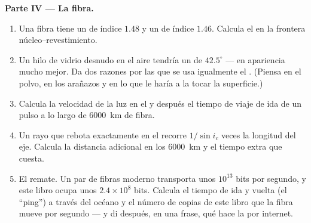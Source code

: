 \begin{problem}
\medskip
\noindent\textbf{Parte IV --- La fibra.}
\begin{enumerate}[resume]
  \item Una fibra tiene un  de índice $1.48$ y un  de
        índice $1.46$. Calcula el  en la frontera
        núcleo--revestimiento.
  \item Un hilo de vidrio desnudo en el aire tendría un  de
        $42.5^\circ$ --- en apariencia mucho mejor. Da dos razones por
        las que se usa igualmente el . (Piensa en el polvo,
        en los arañazos y en lo que le haría a la  tocar la superficie.)
  \item Calcula la velocidad de la luz en el  y después el tiempo
        de viaje de ida de un pulso a lo largo de \qty{6000}{km} de
        fibra.
  \item Un rayo que rebota exactamente en el  recorre
        $1/\sin i_c$ veces la longitud del eje. Calcula la distancia
        adicional en los \qty{6000}{km} y el tiempo extra que cuesta.
  \item El remate. Un par de fibras moderno transporta unos $10^{13}$
        bits por segundo, y este libro ocupa unos
        $2.4 \times 10^8$ bits. Calcula el tiempo de ida y vuelta (el
        ``ping'') a través del océano y el número de copias de este
        libro que la fibra mueve por segundo --- y di después, en una
        frase, qué hace la  por internet.
\end{enumerate}
\end{problem}
